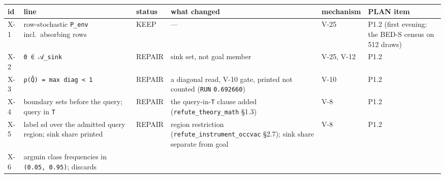 \documentclass[11pt,a4paper]{article}
\newcounter{none}                 %
\theoremstyle{plain}
\theoremstyle{definition}
\theoremstyle{remark}
\begin{document}
{\def\LTcaptype{none} %
\begin{longtable}[]{@{}
  >{\raggedright\arraybackslash}p{}
  >{\raggedright\arraybackslash}p{}
  >{\raggedright\arraybackslash}p{}
  >{\raggedright\arraybackslash}p{}
  >{\raggedright\arraybackslash}p{}
  >{\raggedright\arraybackslash}p{}@{}}
\toprule\noalign{}
\begin{minipage}[b]{\linewidth}\raggedright
id
\end{minipage} & \begin{minipage}[b]{\linewidth}\raggedright
line
\end{minipage} & \begin{minipage}[b]{\linewidth}\raggedright
status
\end{minipage} & \begin{minipage}[b]{\linewidth}\raggedright
what changed
\end{minipage} & \begin{minipage}[b]{\linewidth}\raggedright
mechanism
\end{minipage} & \begin{minipage}[b]{\linewidth}\raggedright
PLAN item
\end{minipage} \\
\midrule\noalign{}
\endhead
\bottomrule\noalign{}
\endlastfoot
X-1 & row-stochastic \texttt{P\_env} incl.~absorbing rows & KEEP & --- &
V-25 & P1.2 (first evening: the BED-S census on 512 draws) \\
X-2 & \texttt{0\ ∈\ 𝒜\_sink} & REPAIR & sink set, not goal member &
V-25, V-12 & P1.2 \\
X-3 & \texttt{ρ(Q̂)\ =\ max\ diag\ \textless{}\ 1} & REPAIR & a diagonal
read, V-10 gate, printed not counted (\texttt{RUN} \texttt{0.692660}) &
V-10 & P1.2 \\
X-4 & boundary sets before the query; query in \texttt{T} & REPAIR & the
query-in-\texttt{T} clause added (\texttt{refute\_theory\_math} §1.3) &
V-8 & P1.2 \\
X-5 & label sd over the admitted query region; sink share printed &
REPAIR & region restriction (\texttt{refute\_instrument\_occvac} §2.7);
sink share separate from goal & V-8 & P1.2 \\
X-6 & argmin class frequencies in \texttt{(0.05,\ 0.95)}; discards &

\end{longtable}}
\end{document}
